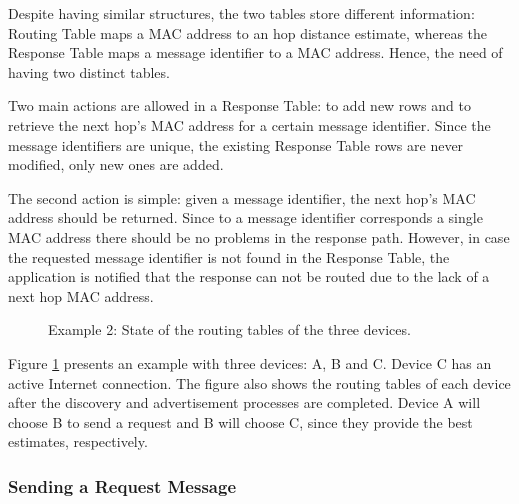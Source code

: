 Despite having similar structures, the two tables store different information: Routing Table maps a \gls{MAC} address to an hop distance estimate, whereas the Response Table maps a message identifier to a \gls{MAC} address. Hence, the need of having two distinct tables.

Two main actions are allowed in a Response Table: to add new rows and to retrieve the next hop's \gls{MAC} address for a certain message identifier. Since the message identifiers are unique, the existing Response Table rows are never modified, only new ones are added.

The second action is simple: given a message identifier, the next hop's \gls{MAC} address should be returned. Since to a message identifier corresponds a single \gls{MAC} address there should be no problems in the response path. However, in case the requested message identifier is not found in the Response Table, the application is notified that the response can not be routed due to the lack of a next hop \gls{MAC} address.


\begin{figure}[ht]
   \noindent{}
	\caption{\label{fig:example1.0} Example 2: State of the routing tables of the three devices.}
\end{figure}

Figure \ref{fig:example1.0} presents an example with three devices: A, B and C. Device C has an active Internet connection. The figure also shows the routing tables of each device after the discovery and advertisement processes are completed. Device A will choose B to send a request and B will choose C, since they provide the best estimates, respectively.


\subsubsection{Sending a Request Message}
\label{subsubsec:sendrqt}

